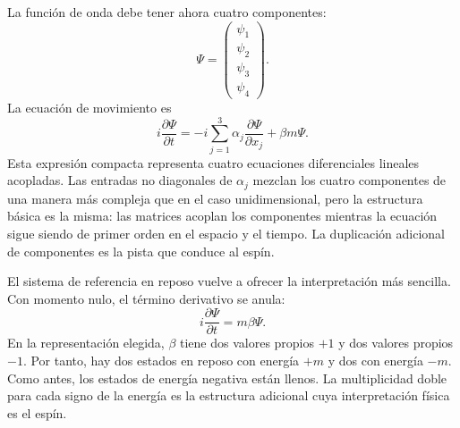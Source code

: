 La función de onda debe tener ahora cuatro componentes:
\begin{equation}
\Psi=
\begin{pmatrix}
\psi_1\\
\psi_2\\
\psi_3\\
\psi_4
\end{pmatrix}.
\end{equation}
La ecuación de movimiento es
\begin{equation}
i\frac{\partial\Psi}{\partial t}
=
-i\sum_{j=1}^{3}\alpha_j
\frac{\partial\Psi}{\partial x_j}
+\beta m\Psi.
\end{equation}
Esta expresión compacta representa cuatro ecuaciones diferenciales lineales acopladas. Las entradas no diagonales de \(\alpha_j\) mezclan los cuatro componentes de una manera más compleja que en el caso unidimensional, pero la estructura básica es la misma: las matrices acoplan los componentes mientras la ecuación sigue siendo de primer orden en el espacio y el tiempo. La duplicación adicional de componentes es la pista que conduce al espín.

\begin{classroomqa}
\end{classroomqa}

El sistema de referencia en reposo vuelve a ofrecer la interpretación más sencilla. Con momento nulo, el término derivativo se anula:
\begin{equation}
i\frac{\partial\Psi}{\partial t}=m\beta\Psi.
\end{equation}
En la representación elegida, \(\beta\) tiene dos valores propios \(+1\) y dos valores propios \(-1\). Por tanto, hay dos estados en reposo con energía \(+m\) y dos con energía \(-m\). Como antes, los estados de energía negativa están llenos. La multiplicidad doble para cada signo de la energía es la estructura adicional cuya interpretación física es el espín.

\begin{classroomqa}
\end{classroomqa}

